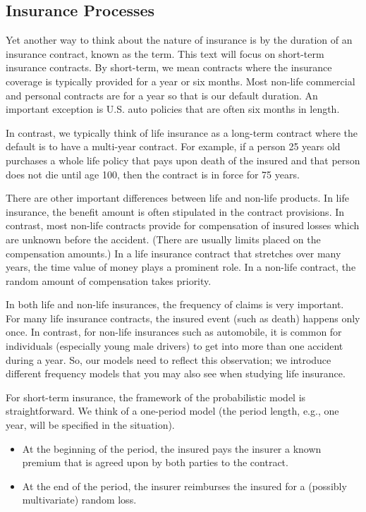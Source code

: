 \documentclass[
]{book}
\providecommand{\tightlist}{%
  \setlength{\itemsep}{0pt}\setlength{\parskip}{0pt}}
\begin{document}
\hypertarget{S:InsProcesses}{%
\subsection{Insurance Processes}\label{S:InsProcesses}}

Yet another way to think about the nature of insurance is by the duration of an insurance contract, known as the term. This text will focus on short-term insurance contracts. By short-term, we mean contracts where the insurance coverage is typically provided for a year or six months. Most non-life commercial and personal contracts are for a year so that is our default duration. An important exception is U.S. auto policies that are often six months in length.

In contrast, we typically think of life insurance as a long-term contract where the default is to have a multi-year contract. For example, if a person 25 years old purchases a whole life policy that pays upon death of the insured and that person does not die until age 100, then the contract is in force for 75 years.

There are other important differences between life and non-life products. In life insurance, the benefit amount is often stipulated in
the contract provisions. In contrast, most non-life contracts provide
for compensation of insured losses which are unknown before the
accident. (There are usually limits placed on the
compensation amounts.) In a life insurance contract that stretches over many years, the time value of money plays a prominent role. In a
non-life contract, the random amount of compensation takes priority.

In both life and non-life insurances, the frequency of claims is very
important. For many life insurance contracts, the insured event (such as
death) happens only once. In contrast, for non-life insurances such as
automobile, it is common for individuals (especially young male drivers)
to get into more than one accident during a year. So, our models need to
reflect this observation; we introduce different frequency models
that you may also see when studying life insurance.

For short-term insurance, the framework of the probabilistic model is
straightforward. We think of a one-period model (the period length,
e.g., one year, will be specified in the situation).

\begin{itemize}
\tightlist
\item
  At the beginning of the period, the insured pays the insurer a known premium that is agreed upon by both parties to the contract.
\item
  At the end of the period, the insurer reimburses the insured for a (possibly multivariate) random loss.
\end{itemize}
\end{document}
